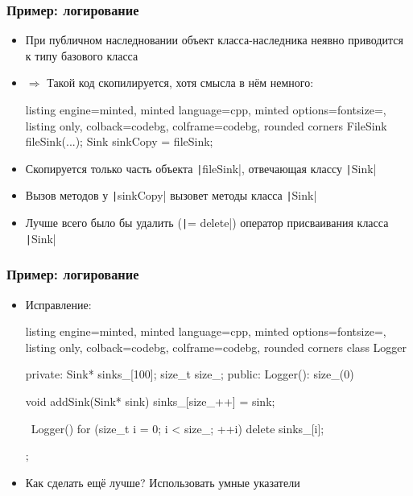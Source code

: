 \documentclass[10pt]{beamer}
\begin{document}
\begin{frame}[fragile]
\frametitle{Пример: логирование}
\begin{itemize}
\item При публичном наследновании объект класса-наследника неявно приводится к типу базового класса
\pause
\item \(\Longrightarrow\) Такой код скопилируется, хотя смысла в нём немного:
\begin{tcblisting}{listing engine=minted, minted language=cpp, minted options={fontsize=\scriptsize}, listing only, colback=codebg, colframe=codebg, rounded corners}
FileSink fileSink(...);
Sink sinkCopy = fileSink;
\end{tcblisting}
\pause
{}
\item Скопируется только часть объекта \texttt|fileSink|, отвечающая классу \texttt|Sink|
\item Вызов методов у \texttt|sinkCopy| вызовет методы класса \texttt|Sink|
\pause
\item Лучше всего было бы удалить (\texttt|= delete|) оператор присваивания класса \texttt|Sink|
\end{itemize}
\end{frame}

\begin{frame}[fragile]
\frametitle{Пример: логирование}
\begin{itemize}
\item Исправление:
\begin{tcblisting}{listing engine=minted, minted language=cpp, minted options={fontsize=\scriptsize}, listing only, colback=codebg, colframe=codebg, rounded corners}
class Logger {
private:
  Sink* sinks_[100];
  size_t size_;
public:
  Logger(): size_(0) {}

  void addSink(Sink* sink) {
    sinks_[size_++] = sink;
  }

  ~Logger() {
    for (size_t i = 0; i < size_; ++i) {
      delete sinks_[i];
    }
  }
};
\end{tcblisting}
\pause
\item Как сделать ещё лучше? \pause Использовать умные указатели
\end{itemize}
\end{frame}
\end{document}
